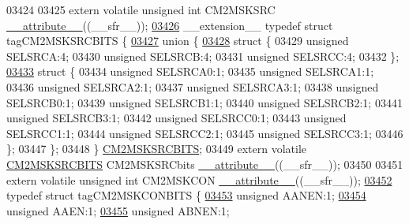 \begin{DoxyCode}
03424 
03425 \textcolor{keyword}{extern} \textcolor{keyword}{volatile} \textcolor{keywordtype}{unsigned} \textcolor{keywordtype}{int}  CM2MSKSRC \hyperlink{a00009_a493c46f03454991ccc5aa7a6e1dfb2a7}{\_\_attribute\_\_}((\_\_sfr\_\_));
\hypertarget{a00009_source_l03426}{}\hyperlink{a00008}{03426} \_\_extension\_\_ \textcolor{keyword}{typedef} \textcolor{keyword}{struct }tagCM2MSKSRCBITS \{
\hypertarget{a00009_source_l03427}{}\hyperlink{a00009}{03427}   \textcolor{keyword}{union }\{
\hypertarget{a00009_source_l03428}{}\hyperlink{a00009}{03428}     \textcolor{keyword}{struct }\{
03429       \textcolor{keywordtype}{unsigned} SELSRCA:4;
03430       \textcolor{keywordtype}{unsigned} SELSRCB:4;
03431       \textcolor{keywordtype}{unsigned} SELSRCC:4;
03432     \};
\hypertarget{a00009_source_l03433}{}\hyperlink{a00009}{03433}     \textcolor{keyword}{struct }\{
03434       \textcolor{keywordtype}{unsigned} SELSRCA0:1;
03435       \textcolor{keywordtype}{unsigned} SELSRCA1:1;
03436       \textcolor{keywordtype}{unsigned} SELSRCA2:1;
03437       \textcolor{keywordtype}{unsigned} SELSRCA3:1;
03438       \textcolor{keywordtype}{unsigned} SELSRCB0:1;
03439       \textcolor{keywordtype}{unsigned} SELSRCB1:1;
03440       \textcolor{keywordtype}{unsigned} SELSRCB2:1;
03441       \textcolor{keywordtype}{unsigned} SELSRCB3:1;
03442       \textcolor{keywordtype}{unsigned} SELSRCC0:1;
03443       \textcolor{keywordtype}{unsigned} SELSRCC1:1;
03444       \textcolor{keywordtype}{unsigned} SELSRCC2:1;
03445       \textcolor{keywordtype}{unsigned} SELSRCC3:1;
03446     \};
03447   \};
03448 \} \hyperlink{a00008_d3/db8/a00316}{CM2MSKSRCBITS};
03449 \textcolor{keyword}{extern} \textcolor{keyword}{volatile} \hyperlink{a00008_d3/db8/a00316}{CM2MSKSRCBITS} CM2MSKSRCbits \hyperlink{a00009_a493c46f03454991ccc5aa7a6e1dfb2a7}{\_\_attribute\_\_}((\_\_sfr\_\_));
03450 
03451 \textcolor{keyword}{extern} \textcolor{keyword}{volatile} \textcolor{keywordtype}{unsigned} \textcolor{keywordtype}{int}  CM2MSKCON \hyperlink{a00009_a493c46f03454991ccc5aa7a6e1dfb2a7}{\_\_attribute\_\_}((\_\_sfr\_\_));
\hypertarget{a00009_source_l03452}{}\hyperlink{a00008}{03452} \textcolor{keyword}{typedef} \textcolor{keyword}{struct }tagCM2MSKCONBITS \{
\hypertarget{a00009_source_l03453}{}\hyperlink{a00008_a6ea89b9cbdf0bbde3ec8147513e70fa0}{03453}   \textcolor{keywordtype}{unsigned} AANEN:1;
\hypertarget{a00009_source_l03454}{}\hyperlink{a00008_a58bba29325ff11212a73bae4b2b1a707}{03454}   \textcolor{keywordtype}{unsigned} AAEN:1;
\hypertarget{a00009_source_l03455}{}\hyperlink{a00008_a1b2c756ac7255e490499f85cb2d746f3}{03455}   \textcolor{keywordtype}{unsigned} ABNEN:1;

\end{DoxyCode}
